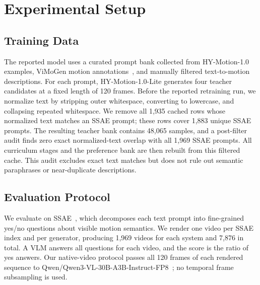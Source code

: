 \documentclass[runningheads]{llncs}
\begin{document}
\section{Experimental Setup}

\subsection{Training Data}

The reported model uses a curated prompt bank collected from
HY-Motion-1.0 examples, ViMoGen motion annotations~\cite{vimogen2026}, and manually filtered
text-to-motion descriptions. For each prompt, HY-Motion-1.0-Lite generates four
teacher candidates at a fixed length of 120 frames. Before the reported
retraining run, we normalize text by stripping outer whitespace, converting to
lowercase, and collapsing repeated whitespace. We remove all 1,935 cached rows
whose normalized text matches an SSAE prompt; these rows cover 1,883 unique
SSAE prompts. The resulting teacher bank contains 48,065 samples, and a
post-filter audit finds zero exact normalized-text overlap with all 1,969 SSAE
prompts. All curriculum stages and the preference bank are then rebuilt from
this filtered cache. This audit excludes exact text matches but does not rule
out semantic paraphrases or near-duplicate descriptions.

\subsection{Evaluation Protocol}

We evaluate on SSAE~\cite{hymotion2025}, which decomposes each text prompt into
fine-grained yes/no questions about visible motion semantics. We render one
video per SSAE index and per generator, producing 1,969 videos for each system
and 7,876 in total. A VLM answers all questions for each video, and the score
is the ratio of yes answers. Our native-video protocol passes all 120 frames of
each rendered sequence to Qwen/Qwen3-VL-30B-A3B-Instruct-FP8~\cite{qwen3vl2025};
no temporal frame subsampling is used.
\end{document}
